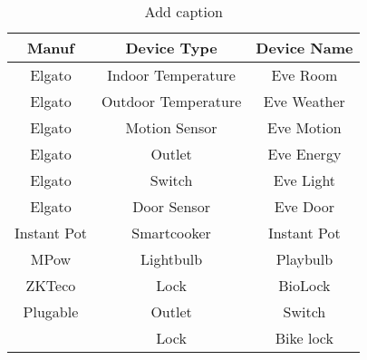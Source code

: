 \begin{table}[h!]
\centering
\caption{Add caption}
	\color{red}
	\begin{tabular}{|c|c|c|}
		\hline
		Manuf & Device Type & Device Name \\
		\hline
		Elgato & Indoor Temperature & Eve Room \\
		\hline
		Elgato & Outdoor Temperature & Eve Weather \\
		\hline
		Elgato & Motion Sensor & Eve Motion \\
		\hline
		Elgato & Outlet & Eve Energy \\
		\hline
		Elgato & Switch & Eve Light \\
		\hline
		Elgato & Door Sensor & Eve Door \\
		\hline
		Instant Pot & Smartcooker & Instant Pot \\
		\hline
		MPow & Lightbulb & Playbulb \\
		\hline
		ZKTeco & Lock & BioLock \\
		\hline
		Plugable & Outlet & Switch \\
		\hline
		 & Lock & Bike lock \\
		\hline
	\end{tabular}
\label{addlabel}
\end{table}